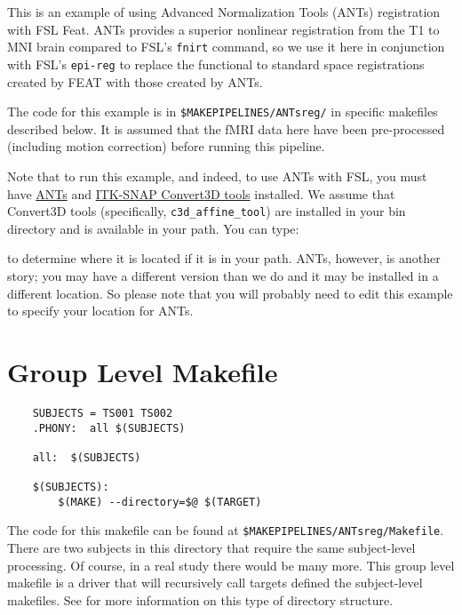 \label{section:antsreg}

This is an example of using Advanced Normalization Tools (ANTs)\citep{ants}
registration with FSL Feat. ANTs provides a superior nonlinear
registration from the T1 to MNI brain compared to FSL's \texttt{fnirt}
command, so we use it here in conjunction with FSL's \texttt{epi-reg}
to replace the functional to standard space registrations created by
FEAT with those created by ANTs. 

The code for this example is in
\texttt{\$MAKEPIPELINES/ANTsreg/} in specific makefiles described
below. It is assumed that the fMRI data here have been pre-processed
(including motion correction) before running this pipeline. 

Note that to run this example, and indeed, to use ANTs with FSL, you
must have \href{http://stnava.github.io/ANTs/}{ANTs} and
\href{http://www.itksnap.org/pmwiki/pmwiki.php?n=Convert3D.Documentation}{ITK-SNAP
  Convert3D tools} installed. We assume that Convert3D tools
(specifically, \texttt{c3d_affine_tool}) are installed in your bin
directory and is available in your path. You can type:

to determine where it is located if it is in your path.
ANTs, however, is another story; you may have a different
version than we do and it may be installed in a different location. So
please note that you will probably need to edit this example to
specify your location for ANTs.

\section{Group Level Makefile}
\begin{lstlisting}
	SUBJECTS = TS001 TS002 
	.PHONY:  all $(SUBJECTS)

	all:  $(SUBJECTS)

	$(SUBJECTS): 
		$(MAKE) --directory=$@ $(TARGET)
\end{lstlisting}

The code for this makefile can be found at \texttt{\$MAKEPIPELINES/ANTsreg/Makefile}. There are two subjects in this directory that require the same
subject-level processing. Of course, in a real study there would be
many more. This group level makefile is a driver that will
recursively call targets defined the subject-level makefiles. See
 for more information on this type of
directory structure.


